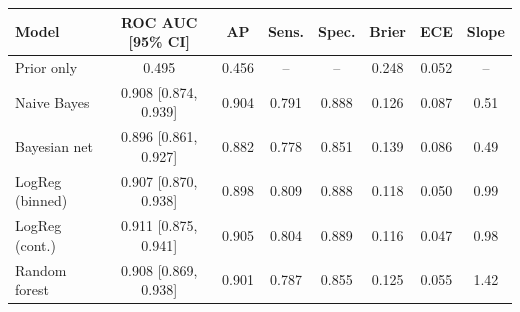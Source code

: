 \begin{tabular}{lccccccc}
\toprule
Model & ROC AUC [95\% CI] & AP & Sens. & Spec. & Brier & ECE & Slope \\
\midrule
Prior only & 0.495 & 0.456 & -- & -- & 0.248 & 0.052 & -- \\
Naive Bayes & 0.908 [0.874, 0.939] & 0.904 & 0.791 & 0.888 & 0.126 & 0.087 & 0.51 \\
Bayesian net & 0.896 [0.861, 0.927] & 0.882 & 0.778 & 0.851 & 0.139 & 0.086 & 0.49 \\
LogReg (binned) & 0.907 [0.870, 0.938] & 0.898 & 0.809 & 0.888 & 0.118 & 0.050 & 0.99 \\
LogReg (cont.) & 0.911 [0.875, 0.941] & 0.905 & 0.804 & 0.889 & 0.116 & 0.047 & 0.98 \\
Random forest & 0.908 [0.869, 0.938] & 0.901 & 0.787 & 0.855 & 0.125 & 0.055 & 1.42 \\
\bottomrule
\end{tabular}
